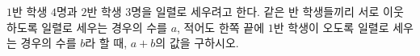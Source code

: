 \hspace*{2mm}\begin{minipage}[t]{\dimexpr\linewidth-2mm\relax}\vspace{0pt}
$1$반 학생 $4$명과 $2$반 학생 $3$명을 일렬로 세우려고 한다. 같은 반 학생들끼리 서로 이웃하도록 일렬로 세우는 경우의 수를 $a$, 적어도 한쪽 끝에 $1$반 학생이 오도록 일렬로 세우는 경우의 수를 $b$라 할 때, $a+b$의 값을 구하시오.\end{minipage}
